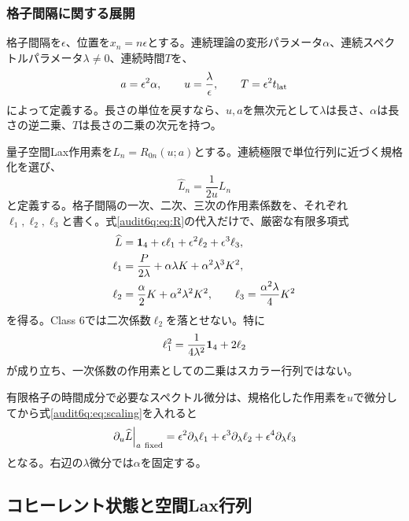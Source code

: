 \subsubsection{格子間隔に関する展開}
格子間隔を$\epsilon$、位置を$x_n=n\epsilon$とする。連続理論の変形パラメータ$\alpha$、連続スペクトルパラメータ$\lambda\ne0$、連続時間$T$を、
\begin{equation}
a=\epsilon^2\alpha,\qquad u=\frac{\lambda}{\epsilon},\qquad
T=\epsilon^2t_{\rm lat}
\label{audit6q:eq:scaling}
\end{equation}
によって定義する。長さの単位を戻すなら、$u,a$を無次元として$\lambda$は長さ、$\alpha$は長さの逆二乗、$T$は長さの二乗の次元を持つ。

量子空間Lax作用素を$L_n=R_{0n}(u;a)$とする。連続極限で単位行列に近づく規格化を選び、
\begin{equation}
\widehat L_n=\frac{1}{2u}L_n
\label{audit6q:eq:Lnorm}
\end{equation}
と定義する。格子間隔の一次、二次、三次の作用素係数を、それぞれ$\ell_1,\ell_2,\ell_3$と書く。式\eqref{audit6q:eq:R}の代入だけで、厳密な有限多項式
\begin{align}
\widehat L&=\mathbf 1_{4}+\epsilon\ell_1+\epsilon^2\ell_2+\epsilon^3\ell_3,
\label{audit6q:eq:Lseries}\\
\ell_1&=\frac{P}{2\lambda}+\alpha\lambda K+\alpha^2\lambda^3K^2,
\label{audit6q:eq:l1}\\
\ell_2&=\frac{\alpha}{2}K+\alpha^2\lambda^2K^2,
\qquad
\ell_3=\frac{\alpha^2\lambda}{4}K^2
\label{audit6q:eq:l23}
\end{align}
を得る。Class 6では二次係数$\ell_2$を落とせない。特に
\begin{equation}
\ell_1^2=\frac{1}{4\lambda^2}\mathbf 1_{4}+2\ell_2
\label{audit6q:eq:l1square}
\end{equation}
が成り立ち、一次係数の作用素としての二乗はスカラー行列ではない。

有限格子の時間成分で必要なスペクトル微分は、規格化した作用素を$u$で微分してから式\eqref{audit6q:eq:scaling}を入れると
\begin{equation}
\left.\partial_u\widehat L\right|_{a\ {\rm fixed}}
=\epsilon^2\partial_\lambda\ell_1
 +\epsilon^3\partial_\lambda\ell_2
 +\epsilon^4\partial_\lambda\ell_3
\label{audit6q:eq:spectralderivative}
\end{equation}
となる。右辺の$\lambda$微分では$\alpha$を固定する。

\subsection{コヒーレント状態と空間Lax行列}
